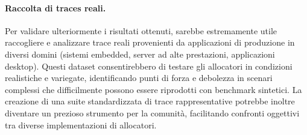 \paragraph{Raccolta di traces reali.}
Per validare ulteriormente i risultati ottenuti, sarebbe estremamente utile raccogliere e analizzare trace reali provenienti da applicazioni di produzione in diversi domini (sistemi embedded, server ad alte prestazioni, applicazioni desktop). Questi dataset consentirebbero di testare gli allocatori in condizioni realistiche e variegate, identificando punti di forza e debolezza in scenari complessi che difficilmente possono essere riprodotti con benchmark sintetici. La creazione di una suite standardizzata di trace rappresentative potrebbe inoltre diventare un prezioso strumento per la comunità, facilitando confronti oggettivi tra diverse implementazioni di allocatori.
